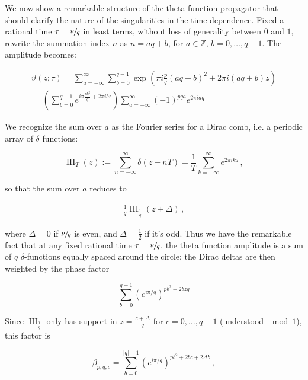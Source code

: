 \documentclass{article}
\newcommand{\T}{\ensuremath{\vartheta}}
\newcommand{\sumZ}{\sum_{n=-\infty}^{\infty}}
\begin{document}
We now show a remarkable structure of the theta function propagator that should clarify the nature of the singularities in the time dependence. Fixed a rational time $\tau = \sfrac{p}{q}$ in least terms, without loss of generality between $0$ and $1$, rewrite the summation index $n$ as $n = aq + b$, for $a \in \mathbb{Z}$, $b = 0,\ldots,q-1$. The amplitude becomes:

\newcommand{\sumA}{\sum_{a=-\infty}^\infty}
\newcommand{\sumB}{\sum_{b=0}^{q-1}}
\newcommand{\sumBnorm}{\sum_{b=0}^{|q|-1}}
\newcommand{\comb}{\operatorname{III}}

\begin{align}
    \T(z;\tau) = \sumA \sumB \exp(\pi i \frac{p}{q} (aq + b)^2  + 2\pi i (aq+b) z)\\
    = \left( \sumB e^{i\pi \frac{p b^2}{q} + 2\pi i b z} \right) \sumA (-1)^{pqa} e^{2\pi i a q} 
\end{align}

We recognize the sum over $a$ as the Fourier series for a Dirac comb, i.e. a periodic array of $\delta$ functions:

\begin{equation}
    \comb_T(z) := \sumZ \delta(z-nT) = \frac{1}{T} \sum_{k=-\infty}^\infty e^{2\pi i k z}\,,
\end{equation}

so that the sum over $a$ reduces to

\begin{align}
    \frac{1}{q} \comb_{\frac{1}{q}} (z+\Delta)\,,
\end{align}

where $\Delta = 0$ if $\sfrac{p}{q}$ is even, and $\Delta = \frac{1}{2}$ if it's odd. Thus we have the remarkable fact that at any fixed rational time $\tau = \sfrac{p}{q}$, the theta function amplitude is a sum of $q$ $\delta$-functions equally spaced around the circle; the Dirac deltas are then weighted by the phase factor

\begin{equation}
    \sumB \left(e^{i\pi/q}\right)^{pb^2 + 2bzq}
\end{equation}

Since $\comb_{\frac{1}{q}}$ only has support in $z = \frac{c+\Delta}{q}$ for $c = 0,\ldots,q-1$ (understood $\mod 1$), this factor is

\begin{equation}\label{betafactor}
    \beta_{p,q,c} = \sumBnorm \left(e^{i\pi/q}\right)^{pb^2 + 2bc + 2\Delta b}\,,
\end{equation}
\end{document}
